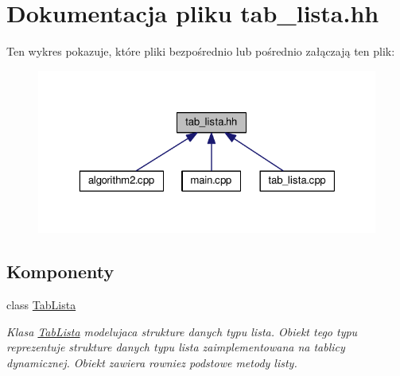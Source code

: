 \hypertarget{tab__lista_8hh}{\section{Dokumentacja pliku tab\-\_\-lista.\-hh}
\label{tab__lista_8hh}
}
Ten wykres pokazuje, które pliki bezpośrednio lub pośrednio załączają ten plik\-:\nopagebreak
\begin{figure}[H]
\begin{center}
\leavevmode
\includegraphics[width=323pt]{tab__lista_8hh__dep__incl}
\end{center}
\end{figure}
\subsection*{Komponenty}
\begin{DoxyCompactItemize}
\item 
class \hyperlink{class_tab_lista}{Tab\-Lista}
\begin{DoxyCompactList}\small\item\em Klasa \hyperlink{class_tab_lista}{Tab\-Lista} modelujaca strukture danych typu lista. Obiekt tego typu reprezentuje strukture danych typu lista zaimplementowana na tablicy dynamicznej. Obiekt zawiera rowniez podstowe metody listy. \end{DoxyCompactList}\end{DoxyCompactItemize}
